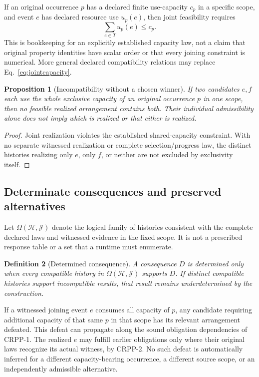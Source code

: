 \documentclass[11pt]{article}
\newtheorem{definition}{Definition}[section]
\newtheorem{proposition}[definition]{Proposition}
\newcommand{\Hist}{\mathcal{H}}
\newcommand{\Laws}{\mathcal{J}}
\begin{document}
If an original occurrence $p$ has a declared finite use-capacity
$c_p$ in a specific scope, and event $e$ has declared resource use
$u_p(e)$, then joint feasibility requires
\begin{equation}\label{eq:jointcapacity}
\sum_{e\in T}u_p(e)\leq c_p.
\end{equation}
This is bookkeeping for an explicitly established capacity law,
not a claim that original property identities have scalar order or
that every joining constraint is numerical. More general declared
compatibility relations may replace Eq.~\eqref{eq:jointcapacity}.

\begin{proposition}[Incompatibility without a chosen winner]
If two candidates $e,f$ each use the whole exclusive capacity
of an original occurrence $p$ in one scope, then no feasible
realized arrangement contains both. Their individual admissibility
alone does not imply which is realized or that either is realized.
\end{proposition}
\begin{proof}
Joint realization violates the established shared-capacity
constraint. With no separate witnessed realization or complete
selection/progress law, the distinct histories realizing only
$e$, only $f$, or neither are not excluded by exclusivity itself.
\end{proof}

\subsection{Determinate consequences and preserved alternatives}
Let $\Omega(\Hist,\Laws)$ denote the logical family of histories
consistent with the complete declared laws and witnessed evidence
in the fixed scope. It is not a prescribed response table or a
set that a runtime must enumerate.

\begin{definition}[Determined consequence]
A consequence $D$ is determined only when every compatible
history in $\Omega(\Hist,\Laws)$ supports $D$. If distinct compatible
histories support incompatible results, that result remains
underdetermined by the construction.
\end{definition}

If a witnessed joining event $e$ consumes all capacity of $p$,
any candidate requiring additional capacity of that same $p$
in that scope has its relevant arrangement defeated. This defeat
can propagate along the sound obligation dependencies of CRPP-1.
The realized $e$ may fulfill earlier obligations only where their
original laws recognize its actual witness, by CRPP-2.
No such defeat is automatically inferred for a different
capacity-bearing occurrence, a different source scope, or
an independently admissible alternative.
\end{document}
